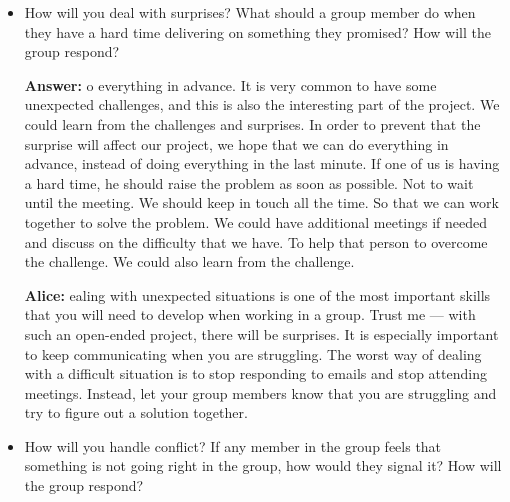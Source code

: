 \documentclass[12pt]{article}
\newenvironment{answer}[1]{
\color{blue}
	{\bf Answer:}
}{
}
\newenvironment{alice}[1]{
\color{magenta}
	{\bf Alice:}
}{
}
\begin{document}
\begin{itemize}
\begin{alice}

It is a good idea to discuss your ``procrastination'' habit here.  (Let's be honest.  We all procrastinate to some extent. =)  You will want to set an early enough deadline such that every group member will have their work ready and there is enough time for other group members to go over the work and modify it appropriately.  Doing this can avoid situations such as ``my group member did not complete their work until the day when the report is due and they left no time for me to review and modify the report.''
\end{alice}

\item How will you deal with surprises? What should a group member do when they have a hard time delivering on something they promised? How will the group respond?

\begin{answer}

Do everything in advance. It is very common to have some unexpected challenges, and this is also the interesting part of the project. We could learn from the challenges and surprises. In order to prevent that the surprise will affect our project, we hope that we can do everything in advance, instead of doing everything in the last minute. 
If one of us is having a hard time, he should raise the problem as soon as possible. Not to wait until the meeting. We should keep in touch all the time. So that we can work together to solve the problem. We could have additional meetings if needed and discuss on the difficulty that we have. To help that person to overcome the challenge. We could also learn from the challenge.
\end{answer}

\begin{alice}

Dealing with unexpected situations is one of the most important skills that you will need to develop when working in a group.  Trust me --- with such an open-ended project, there will be surprises.  It is especially important to keep communicating when you are struggling.  The worst way of dealing with a difficult situation is to stop responding to emails and stop attending meetings.  Instead, let your group members know that you are struggling and try to figure out a solution together.
\end{alice}

\item How will you handle conflict? If any member in the group feels that something is not going right in the group, how would they signal it? How will the group respond?


\end{itemize}
\end{document}
